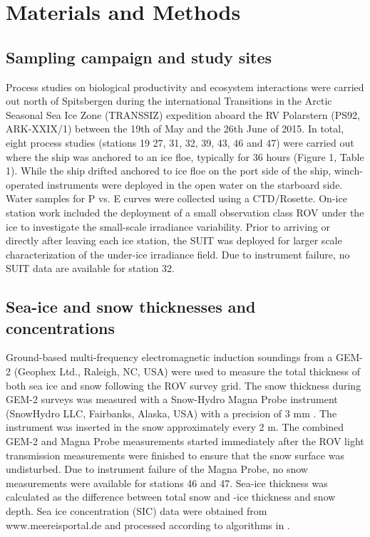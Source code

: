 \section{Materials and Methods}

\subsection{Sampling campaign and study sites}

Process studies on biological productivity and ecosystem interactions were carried out north of Spitsbergen during the international Transitions in the Arctic Seasonal Sea Ice Zone (TRANSSIZ) expedition aboard the RV Polarstern (PS92, ARK-XXIX/1) between the 19th of May and the 26th June of 2015. In total, eight process studies (stations 19 27, 31, 32, 39, 43, 46 and 47) were carried out where the ship was anchored to an ice floe, typically for 36 hours (Figure 1, Table 1). While the ship drifted anchored to ice floe on the port side of the ship, winch-operated instruments were deployed in the open water on the starboard side. Water samples for P vs. E curves were collected using a CTD/Rosette. On-ice station work included the deployment of a small observation class ROV under the ice to investigate the small-scale irradiance variability. Prior to arriving or directly after leaving each ice station, the SUIT was deployed for larger scale characterization of the under-ice irradiance field. Due to instrument failure, no SUIT data are available for station 32.

\subsection{Sea-ice and snow thicknesses and concentrations}

Ground-based multi-frequency electromagnetic induction soundings from a GEM-2 (Geophex Ltd., Raleigh, NC, USA) were used to measure the total thickness of both sea ice and snow following the ROV survey grid. The snow thickness during GEM-2 surveys was measured with a Snow-Hydro Magna Probe instrument (SnowHydro LLC, Fairbanks, Alaska, USA) with a precision of 3 mm \citep{Sturm2006}. The instrument was inserted in the snow approximately every 2 m. The combined GEM-2 and Magna Probe measurements started immediately after the ROV light transmission measurements were finished to ensure that the snow surface was undisturbed. Due to instrument failure of the Magna Probe, no snow measurements were available for stations 46 and 47. Sea-ice thickness was calculated as the difference between total snow and -ice thickness and snow depth. Sea ice concentration (SIC) data were obtained from www.meereisportal.de and processed according to algorithms in \citet{Spreen2008}.

